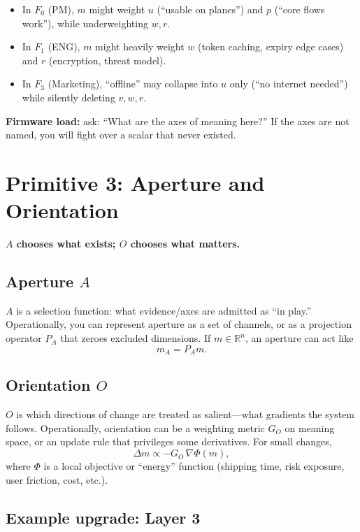 \documentclass[11pt]{article}
\begin{document}
\begin{itemize}[leftmargin=2em]
  \item In $F_0$ (PM), $m$ might weight $u$ (``usable on planes'') and $p$ (``core flows work''), while underweighting $w,r$.
  \item In $F_1$ (ENG), $m$ might heavily weight $w$ (token caching, expiry edge cases) and $r$ (encryption, threat model).
  \item In $F_3$ (Marketing), ``offline'' may collapse into $u$ only (``no internet needed'') while silently deleting $v,w,r$.
\end{itemize}

\textbf{Firmware load:} ask: ``What are the axes of meaning here?'' If the axes are not named, you will fight over a scalar that never existed.

\section{Primitive 3: Aperture and Orientation}

\textbf{$A$ chooses what exists; $O$ chooses what matters.}

\subsection{Aperture $A$}

$A$ is a selection function: what evidence/axes are admitted as ``in play.'' Operationally, you can represent aperture as a set of channels, or as a projection operator $P_A$ that zeroes excluded dimensions. If $m\in\mathbb{R}^n$, an aperture can act like
\[
  m_A = P_A m.
\]

\subsection{Orientation $O$}

$O$ is which directions of change are treated as salient---what gradients the system follows. Operationally, orientation can be a weighting metric $G_O$ on meaning space, or an update rule that privileges some derivatives. For small changes,
\[
  \Delta m \propto -G_O\,\nabla \Phi(m),
\]
where $\Phi$ is a local objective or ``energy'' function (shipping time, risk exposure, user friction, cost, etc.).

\subsection{Example upgrade: Layer 3}
\end{document}
